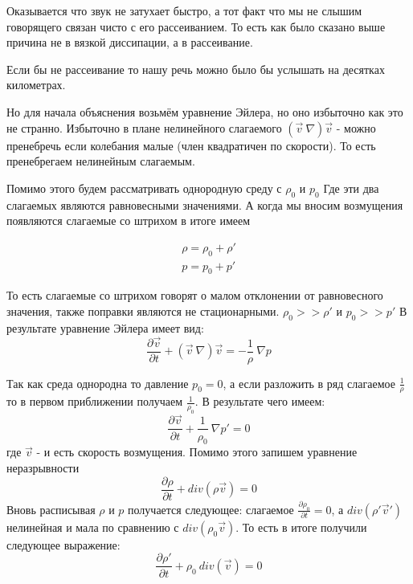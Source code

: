 \documentclass[14pt,a4paper,oneside]{extarticle}	%
\begin{document}
Оказывается что звук не затухает быстро, а тот факт что мы не слышим говорящего связан чисто с его рассеиванием.
То есть как было сказано выше причина не в вязкой диссипации, а в рассеивание.

 Если бы не рассеивание то нашу речь можно было бы услышать на десятках километрах.

 Но для начала объяснения возьмём уравнение Эйлера, но оно избыточно как это не странно.
 Избыточно в плане нелинейного слагаемого $ (\vec{v}\:\nabla)\vec{v} $ - можно пренебречь если колебания малые (член квадратичен по скорости).
 То есть пренебрегаем нелинейным слагаемым.

 Помимо этого будем рассматривать однородную среду с $ \rho_{0} $ и $ p_{0} $
 Где эти два слагаемых являются равновесными значениями.
 А когда мы вносим возмущения появляются слагаемые со штрихом в итоге имеем

\begin{eqnarray}
\rho = \rho_{0} + \rho' \\
p = p_{0} + p'
\end{eqnarray}


То есть слагаемые со штрихом говорят о малом отклонении от равновесного значения, также поправки являются не стационарными.
$ \rho_{0} >> \rho' $ и 
$ p_{0} >> p' $
В результате уравнение Эйлера имеет вид:
\begin{equation}\label{3}
\frac{\partial \vec{v}}{\partial t} + (\vec{v}\:\nabla)\vec{v} = -\frac{1}{\rho}\: \nabla p
\end{equation}

Так как среда однородна то давление $ p_{0} = 0 $, а если разложить в ряд слагаемое $ \frac{1}{\rho} $ то в первом приближении получаем $ \frac{1}{\rho_{0}} $.
В результате чего имеем:
\begin{equation}\label{4}
\frac{\partial \vec{v}}{\partial t} + \frac{1}{\rho_{0}}\: \nabla p' = 0
\end{equation}
где $ \vec{v} $ - и есть скорость возмущения.
Помимо этого запишем уравнение неразрывности 
\begin{equation}\label{5}
\frac{\partial \rho}{\partial t} + div( \rho \vec{v}) = 0
\end{equation}
Вновь расписывая $ \rho $ и $ p $ получается следующее:
слагаемое $ \frac{\partial \rho_{0}}{\partial t} = 0 $, а $ div( \rho'\vec{v}') $ нелинейная и мала по сравнению с $ div( \rho_{0}\vec{v}) $. То есть в итоге получили следующее выражение:
\begin{equation}\label{6}
\frac{\partial \rho'}{\partial t} + \rho_{0}\: div(\vec{v}) = 0
\end{equation}
\end{document}

